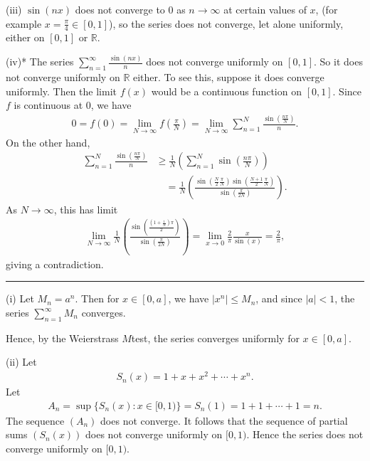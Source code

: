 \documentclass[letterpaper,10pt,english]{jupyterBook}
\begin{document}
\sphinxAtStartPar
(iii) \(\sin (nx)\) does not converge to \(0\) as \(n\rightarrow \infty\) at certain values of \(x\), (for example \(x=\frac{\pi}{4}\in [0,1]\)),  so the series does not converge, let alone uniformly, either on \([0,1]\) or \(\mathbb{R}\).

\sphinxAtStartPar
(iv)* The series \(\sum_{n=1}^\infty  \frac{\sin (nx)}{n}\) does not converge uniformly on \([0,1]\). So it does not converge uniformly on \(\mathbb{R}\) either. To see this, suppose it does converge uniformly. Then the limit \(f(x)\) would be a continuous function on \([0,1]\). Since \(f\) is continuous at \(0\), we have
\begin{equation*}
\begin{split}
0=f(0)=\lim_{N\to\infty} f(\frac{\pi}{N})=\lim_{N\to\infty} \sum_{n=1}^N \frac{\sin\left(\frac{n\pi}{N}\right)}{n}.
\end{split}
\end{equation*}
\sphinxAtStartPar
On the other hand,
\begin{align*}
\sum_{n=1}^N \frac{\sin\left(\frac{n\pi}{N}\right)}{n}&\geq \frac{1}{N}\left( \sum_{n=1}^N \sin\left(\frac{n\pi}{N}\right)\right)\\
&\quad =\frac{1}{N}\left( \frac{\sin(\frac{N}{2}\frac{\pi}{N})\sin(\frac{N+1}{2}\frac{\pi}{N})}{\sin(\frac{\pi}{2N})}\right).
\end{align*}
\sphinxAtStartPar
As \( N\to \infty\), this has limit
\begin{equation*}
\begin{split}
\lim_{N\to\infty} \frac{1}{N}\left(\frac{\sin(\frac{\left(1+\frac{1}{N}\right)\pi}{2})}{\sin(\frac{\pi}{2N})}\right)
=\lim_{x\to 0}\frac{2}{\pi}\frac{x}{\sin(x)}=\frac{2}{\pi},
\end{split}
\end{equation*}
\sphinxAtStartPar
giving a contradiction.


\bigskip\hrule\bigskip


\sphinxAtStartPar
{\hyperref[\detokenize{Problems:id63}]{}}
(i) Let \(M_n =a^n\). Then for \(x\in [0,a]\), we have \(|x^n|\leq M_n\), and since \(|a|<1\), the series \(\sum_{n=1}^\infty M_n\) converges.

\sphinxAtStartPar
Hence, by the Weierstrass \(M\)\sphinxhyphen{}test, the series converges uniformly for \(x\in [0,a]\).

\sphinxAtStartPar
(ii) Let
\begin{equation*}
\begin{split}
S_n(x) = 1+x+x^2+\cdots + x^n.
\end{split}
\end{equation*}
\sphinxAtStartPar
Let
\begin{equation*}
\begin{split}
A_n = \sup \{ S_n (x) : x\in [0,1 ) \} = S_n(1) =1+1 + \cdots + 1 = n.
\end{split}
\end{equation*}
\sphinxAtStartPar
The sequence  \((A_n)\) does not converge. It follows that the sequence of partial sums \((S_n(x))\) does not converge uniformly on \([0,1)\). Hence the series does not converge uniformly on \([0,1)\).
\end{document}
